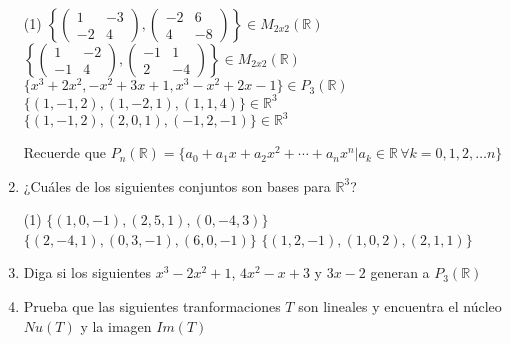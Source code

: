 \documentclass[letterpaper,11pt]{article}
\begin{document}
\begin{enumerate}
\begin{tasks}(1)
\task $\left \lbrace \begin{pmatrix} 1 & -3 \\ -2 & 4 \end{pmatrix} , \begin{pmatrix} -2 & 6 \\ 4 & -8 \end{pmatrix} \right \rbrace \in M_{2x2}(\mathbb{R})$
\task $\left \lbrace \begin{pmatrix} 1 & -2 \\ -1 & 4 \end{pmatrix} ,\begin{pmatrix} -1 & 1 \\ 2 & -4 \end{pmatrix}  \right \rbrace \in M_{2x2}(\mathbb{R})$
\task $\lbrace x^{3} + 2x^{2}, -x^{2} + 3x + 1, x^{3} - x^{2} + 2x -1 \rbrace \in P_{3}(\mathbb{R})$ \task $\lbrace (1,-1,2), (1,-2,1), (1,1,4) \rbrace \in \mathbb{R}^{3}$
\task $\lbrace (1,-1,2), (2,0,1),(-1,2,-1)\rbrace \in \mathbb{R}^{3}$
\end{tasks}
Recuerde que $P_{n}(\mathbb{R}) = \{ a_0 +  a_1x +  a_2x^2 + \cdots +  a_n x^n \big\vert a_k \in \mathbb{R} \,  \forall k = 0,1,2,\dots n\}$

\item ¿Cuáles de los siguientes conjuntos son bases para $\mathbb{R}^{3}$?
\begin{tasks}(1)
\task  $\lbrace (1,0,-1),(2,5,1),(0,-4,3) \rbrace$
\task $\lbrace (2,-4,1),(0,3,-1),(6,0,-1) \rbrace$
\task $\lbrace (1,2,-1),(1,0,2),(2,1,1) \rbrace$
\end{tasks}


\item Diga si los siguientes $x^{3} - 2x^{2} +1$,  $4x^{2} - x + 3$ y $3x - 2$ generan a $P_{3}(\mathbb{R})$

\item Prueba que las siguientes tranformaciones $T$ son lineales y encuentra el núcleo $Nu(T)$ y la imagen $Im(T)$


\end{enumerate}
\end{document}
